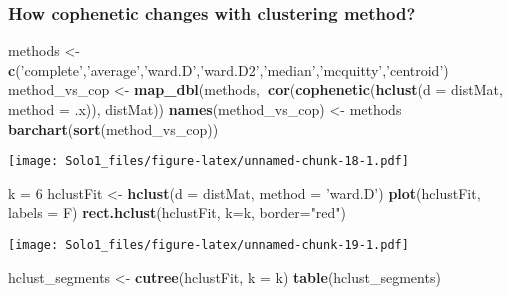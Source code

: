 \documentclass[]{article}
\newenvironment{Shaded}{\begin{snugshade}}{\end{snugshade}}
\newcommand{\KeywordTok}[1]{\textcolor[rgb]{0.13,0.29,0.53}{\textbf{#1}}}
\newcommand{\DataTypeTok}[1]{\textcolor[rgb]{0.13,0.29,0.53}{#1}}
\newcommand{\DecValTok}[1]{\textcolor[rgb]{0.00,0.00,0.81}{#1}}
\newcommand{\StringTok}[1]{\textcolor[rgb]{0.31,0.60,0.02}{#1}}
\newcommand{\OperatorTok}[1]{\textcolor[rgb]{0.81,0.36,0.00}{\textbf{#1}}}
\newcommand{\NormalTok}[1]{#1}
\begin{document}
\subsubsection{How cophenetic changes with clustering
method?}\label{how-cophenetic-changes-with-clustering-method}

\begin{Shaded}
\begin{Highlighting}[]
\NormalTok{methods <-}\StringTok{ }\KeywordTok{c}\NormalTok{(}\StringTok{'complete'}\NormalTok{,}\StringTok{'average'}\NormalTok{,}\StringTok{'ward.D'}\NormalTok{,}\StringTok{'ward.D2'}\NormalTok{,}\StringTok{'median'}\NormalTok{,}\StringTok{'mcquitty'}\NormalTok{,}\StringTok{'centroid'}\NormalTok{)}
\NormalTok{method_vs_cop <-}\StringTok{ }\KeywordTok{map_dbl}\NormalTok{(methods,}\OperatorTok{~}\KeywordTok{cor}\NormalTok{(}\KeywordTok{cophenetic}\NormalTok{(}\KeywordTok{hclust}\NormalTok{(}\DataTypeTok{d =}\NormalTok{ distMat, }\DataTypeTok{method =}\NormalTok{ .x)), distMat))}
\KeywordTok{names}\NormalTok{(method_vs_cop) <-}\StringTok{ }\NormalTok{methods}
\KeywordTok{barchart}\NormalTok{(}\KeywordTok{sort}\NormalTok{(method_vs_cop))}
\end{Highlighting}
\end{Shaded}

\texttt{[image: Solo1\_files/figure-latex/unnamed-chunk-18-1.pdf]}

\begin{Shaded}
\begin{Highlighting}[]
\NormalTok{k =}\StringTok{ }\DecValTok{6}
\NormalTok{hclustFit <-}\StringTok{ }\KeywordTok{hclust}\NormalTok{(}\DataTypeTok{d =}\NormalTok{ distMat, }\DataTypeTok{method =} \StringTok{'ward.D'}\NormalTok{)}
\KeywordTok{plot}\NormalTok{(hclustFit, }\DataTypeTok{labels =}\NormalTok{ F)}
\KeywordTok{rect.hclust}\NormalTok{(hclustFit, }\DataTypeTok{k=}\NormalTok{k, }\DataTypeTok{border=}\StringTok{"red"}\NormalTok{)}
\end{Highlighting}
\end{Shaded}

\texttt{[image: Solo1\_files/figure-latex/unnamed-chunk-19-1.pdf]}

\begin{Shaded}
\begin{Highlighting}[]
\NormalTok{hclust_segments <-}\StringTok{ }\KeywordTok{cutree}\NormalTok{(hclustFit, }\DataTypeTok{k =}\NormalTok{ k)}
\KeywordTok{table}\NormalTok{(hclust_segments)}
\end{Highlighting}
\end{Shaded}
\end{document}
